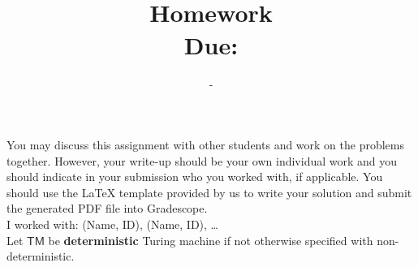 \documentclass{article}
\title{
    \vspace{-0.4in}
    \textmd{\textbf{\hmwkClass \\ Homework \hmwkNo}} \\
    \normalsize\vspace{0.1in}\small{Due: \hmwkDueDate} \\
}
\author{\hmwkAuthorName\ -\ \hmwkAuthorID}
\date{}
\newcommand{\TM}{\mathsf{TM}}
\begin{document}
\maketitle
\thispagestyle{fancy}

You may discuss this assignment with other students and work on the problems together. However, your write-up should be your own individual work and you should indicate in your submission who you worked with, if applicable. You should use the {\LaTeX} template provided by us to write your solution and submit the generated PDF file into Gradescope. \\

I worked with: (Name, ID), (Name, ID), \ldots \\

Let $\TM$ be \textbf{deterministic} Turing machine if not otherwise specified with non-deterministic.
\end{document}
